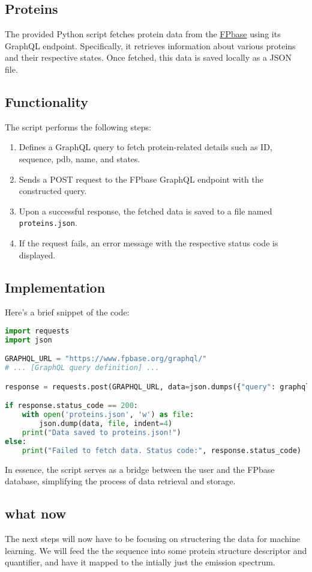 \documentclass{article}
\begin{document}
\subsection{Proteins}

The provided Python script fetches protein data from the \href{https://www.fpbase.org/}{FPbase} using its GraphQL endpoint. Specifically, it retrieves information about various proteins and their respective states. Once fetched, this data is saved locally as a JSON file.

\subsection{Functionality}

The script performs the following steps:

\begin{enumerate}
    \item Defines a GraphQL query to fetch protein-related details such as ID, sequence, pdb, name, and states.
    \item Sends a POST request to the FPbase GraphQL endpoint with the constructed query.
    \item Upon a successful response, the fetched data is saved to a file named \texttt{proteins.json}.
    \item If the request fails, an error message with the respective status code is displayed.
\end{enumerate}

\subsection{Implementation}

Here's a brief snippet of the code:

\begin{lstlisting}[language=Python]
import requests
import json

GRAPHQL_URL = "https://www.fpbase.org/graphql/"
# ... [GraphQL query definition] ...

response = requests.post(GRAPHQL_URL, data=json.dumps({"query": graphql_query}), headers=headers)

if response.status_code == 200:
    with open('proteins.json', 'w') as file:
        json.dump(data, file, indent=4)
    print("Data saved to proteins.json!")
else:
    print("Failed to fetch data. Status code:", response.status_code)
\end{lstlisting}

In essence, the script serves as a bridge between the user and the FPbase database, simplifying the process of data retrieval and storage.

\subsection{what now}
The next steps will now have to be focusing on structering the data for machine learning. We will feed the the sequence into some protein structure descriptor and quantifier, and have it mapped to the intially just the emission spectrum.
\end{document}
